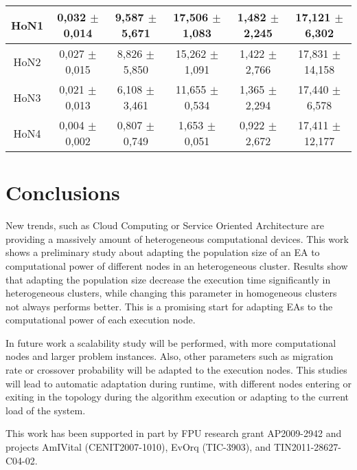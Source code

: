 \begin{table*}
\begin{tabular}{|c|c|c|c|c|c|}
HoN1	& 0,032	$\pm$ 0,014	& 9,587 $\pm$ 	5,671		& 17,506	$\pm$ 1,083		& 1,482	$\pm$ 2,245	&17,121  $\pm$ 	6,302 \\ \hline
HoN2	& 0,027	$\pm$ 0,015	& 8,826	$\pm$ 5,850			& 15,262	$\pm$ 1,091		& 1,422	$\pm$ 2,766	&17,831	 $\pm$ 14,158 \\ \hline
HoN3	& 0,021	$\pm$ 0,013	& 6,108	$\pm$ 3,461			& 11,655	$\pm$ 0,534		& 1,365	$\pm$ 2,294  &17,440  $\pm$ 	6,578 \\ \hline
HoN4	& 0,004	$\pm$ 0,002	& 0,807	$\pm$ 0,749			& 1,653		$\pm$ 0,051		& 0,922	$\pm$ 2,672	&17,411	 $\pm$ 12,177 \\ \hline
\end{tabular}
\label{tab:onemaxtimes}
\end{table*}

\section{Conclusions}
New trends, such as Cloud Computing or Service Oriented Architecture are providing a massively amount of heterogeneous computational devices. This work shows a preliminary study about adapting the population size of an EA to computational power of different nodes in an heterogeneous cluster. Results show that adapting the population size decrease the execution time significantly in heterogeneous clusters, while changing this parameter in homogeneous clusters not always performs better. This is a promising start for adapting EAs to the computational power of each execution node.

In future work a scalability study will be performed, with more computational nodes and larger problem instances. Also, other parameters such as migration rate or crossover probability will be adapted to the execution nodes. This studies will lead to automatic adaptation during runtime, with different nodes entering or exiting in the topology during the algorithm execution or adapting to the current load of the system.



\begin{acknowledgements}
This work has been supported in part by FPU research grant AP2009-2942 and projects AmIVital (CENIT2007-1010), EvOrq (TIC-3903), and TIN2011-28627-C04-02.
\end{acknowledgements}

 






